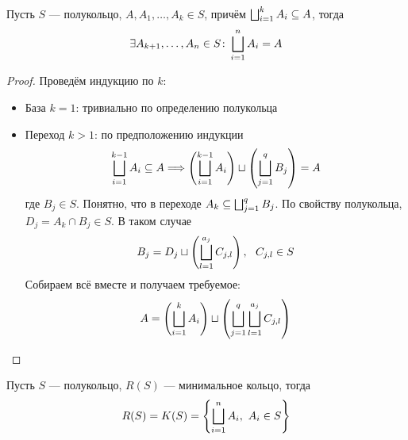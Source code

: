 \begin{lemma}
	Пусть $S$ --- полукольцо, $A, A_1, \ldots, A_k \in S$, причём $\bigsqcup_{i = 1}^k A_i \subseteq A$, тогда
	\[
		\exists A_{k + 1}, \ldots, A_n \in S \colon \bigsqcup_{i = 1}^n A_i = A
	\]
\end{lemma}

\begin{proof}
	Проведём индукцию по $k$:
	\begin{itemize}
		\item База $k = 1$: тривиально по определению полукольца
		
		\item Переход $k > 1$: по предположению индукции
		\[
			\bigsqcup_{i = 1}^{k - 1} A_i \subseteq A \Longrightarrow \left(\bigsqcup_{i = 1}^{k - 1} A_i\right) \sqcup \left(\bigsqcup_{j = 1}^q B_j\right) = A
		\]
		где $B_j \in S$. Понятно, что в переходе $A_k \subseteq \bigsqcup_{j = 1}^q B_j$. По свойству полукольца, $D_j = A_k \cap B_j \in S$. В таком случае
		\[
			B_j = D_j \sqcup \left(\bigsqcup_{l = 1}^{a_j} C_{j, l}\right),\ \ C_{j, l} \in S
		\]
		Собираем всё вместе и получаем требуемое:
		\[
			A = \left(\bigsqcup_{i = 1}^k A_i\right) \sqcup \left(\bigsqcup_{j = 1}^q \bigsqcup_{l = 1}^{a_j} C_{j, l}\right)
		\]
	\end{itemize}
\end{proof}

\begin{theorem}
	Пусть $S$ --- полукольцо, $R(S)$ --- минимальное кольцо, тогда
	\[
		R(S) = K(S) = \left\{\bigsqcup_{i = 1}^n A_i,\ A_i \in S\right\}
	\]
\end{theorem}

